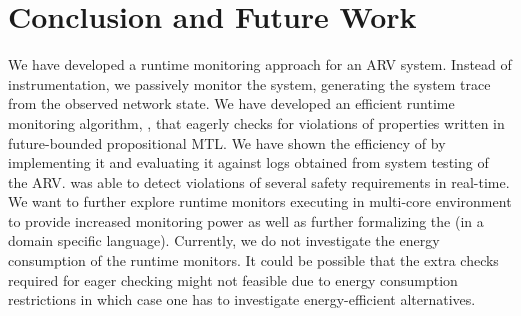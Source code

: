 
\section{Conclusion and Future Work}
We have developed a runtime monitoring approach for an ARV system.
Instead of instrumentation, we passively monitor the system, generating the system trace from the observed network state.
We have developed an efficient runtime monitoring algorithm, \monitor, that eagerly checks for violations of properties written
in future-bounded propositional MTL. We have shown the efficiency of \monitor by implementing it and evaluating it against
logs obtained from system testing of the ARV.
\monitor was able to detect violations of several safety requirements in real-time.
We want to further explore runtime monitors executing in multi-core environment to provide increased
monitoring power as well as further formalizing the \sfmap (in a domain specific language).
 Currently, we do not investigate the energy consumption of the runtime monitors.
 It could be possible that the extra checks required for eager checking might not
 feasible due to energy consumption restrictions in which case one has to investigate energy-efficient alternatives.
